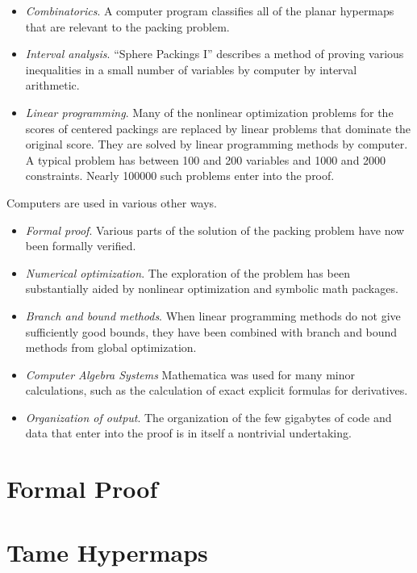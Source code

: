 \begin{itemize}
\item {\it Combinatorics}.  A computer program classifies all of the
  planar hypermaps that are relevant to the packing problem.
\item {\it  Interval analysis}.  ``Sphere Packings
I'' describes a method of proving various inequalities in a small number
of variables by computer by interval arithmetic.
\item {\it  Linear programming}.  Many of the nonlinear optimization
problems for the scores of centered packings are replaced by linear
problems that dominate the original score.  They are solved
by linear programming methods by computer.  A typical problem has
between 100 and 200 variables and 1000 and 2000 constraints.  Nearly
100000
such problems enter into the proof.
\end{itemize}

Computers are used in various other ways.  


\begin{itemize}
\item {\it Formal proof}.
Various parts of the solution of the packing problem have now been
formally verified.
\item  {\it Numerical optimization}.  The exploration of the problem
has been substantially
aided by nonlinear optimization and symbolic math packages.
\item {\it Branch and bound methods}.  When linear programming methods
  do not give sufficiently good bounds, they have been combined with
  branch and bound methods from global optimization.
\item {\it Computer Algebra Systems} Mathematica was used for many
  minor calculations, such as the calculation of exact explicit
  formulas for derivatives.
\item {\it Organization of output}.
The organization of the few gigabytes of code and data that
enter into the proof is in itself a nontrivial undertaking.
\end{itemize}



\section{Formal Proof}


\section{Tame Hypermaps}

